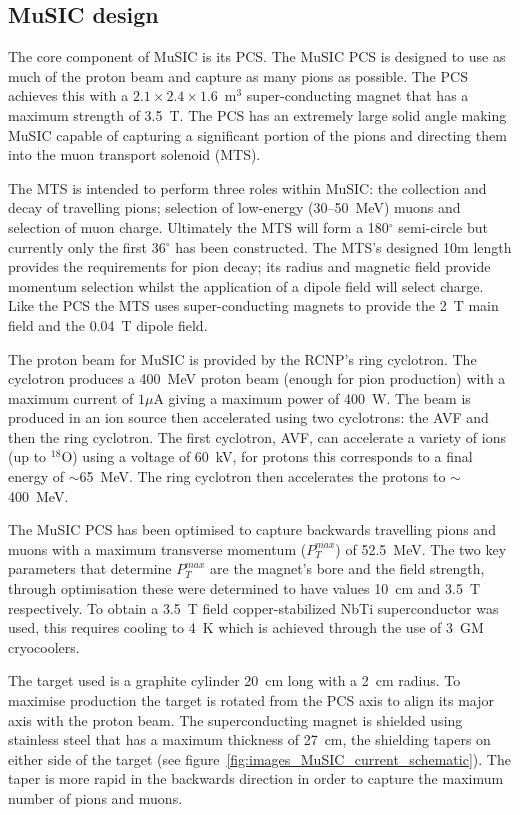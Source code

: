 \subsection{MuSIC design} %
\label{sec:music_design}
The core component of MuSIC is its PCS. The MuSIC PCS is designed to use as much of the proton beam and capture as many pions as possible. The PCS achieves this with a \(2.1\times2.4\times1.6\)~m\(^3\) super-conducting magnet that has a maximum strength of 3.5~T. The PCS has an extremely large solid angle making MuSIC capable of capturing a significant portion of the pions and directing them into the muon transport solenoid (MTS).

The MTS is intended to perform three roles within MuSIC: the collection and decay of travelling pions; selection of low-energy (30--50~MeV) muons and selection of muon charge. Ultimately the MTS will form a 180\(^{\circ}\) semi-circle but currently only the first 36\(^{\circ}\) has been constructed. The MTS's designed 10m length provides the requirements for pion decay; its radius and magnetic field provide momentum selection whilst the application of a dipole field will select charge. Like the PCS the MTS uses super-conducting magnets to provide the 2~T main field and the 0.04~T dipole field.

The proton beam for MuSIC is provided by the RCNP's ring cyclotron. The cyclotron produces a 400~MeV proton beam (enough for pion production) with a maximum current of \( 1\mu \)A giving a maximum power of 400~W. The beam is produced in an ion source then accelerated using two cyclotrons: the AVF and then the ring cyclotron. The first cyclotron, AVF, can accelerate a variety of ions (up to \(^{18}\)O) using a voltage of 60~kV, for protons this corresponds to a final energy of \(\sim\)65~MeV. The ring cyclotron then accelerates the protons to \( \sim \)400~MeV. 

The MuSIC PCS has been optimised to capture backwards travelling pions and muons with a maximum transverse momentum (\(P_{T}^{max}\)) of 52.5~MeV. The two key parameters that determine \(P_{T}^{max}\) are the magnet's bore and the field strength, through optimisation these were determined to have values 10~cm and 3.5~T respectively. To obtain a 3.5~T field copper-stabilized NbTi superconductor was used, this requires cooling to 4~K which is achieved through the use of 3~GM cryocoolers. 

The target used is a graphite cylinder 20~cm long with a 2~cm radius. To maximise production the target is rotated from the PCS axis to align its major axis with the proton beam. The superconducting magnet is shielded using stainless steel that has a maximum thickness of 27~cm, the shielding tapers on either side of the target (see figure~\ref{fig:images_MuSIC_current_schematic}). The taper is more rapid in the backwards direction in order to capture the maximum number of pions and muons.  

